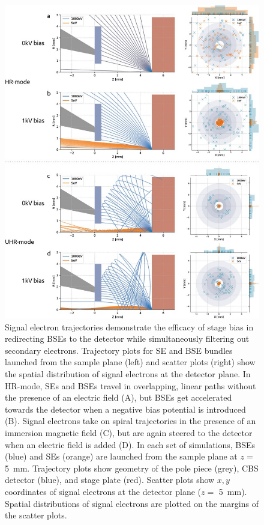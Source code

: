 \begin{figure}[!tbh]
    \centering
    \includegraphics[width=0.85\linewidth]{chapter-2/figures_JPEG_LQ/fig2-2_simulations.jpg}
    \caption{Signal electron trajectories demonstrate the efficacy of stage bias in redirecting BSEs to the detector while simultaneously filtering out secondary electrons. Trajectory plots for SE and BSE bundles launched from the sample plane (left) and scatter plots (right) show the spatial distribution of signal electrons at the detector plane. In HR-mode, SEs and BSEs travel in overlapping, linear paths without the presence of an electric field (A), but BSEs get accelerated towards the detector when a negative bias potential is introduced (B). Signal electrons take on spiral trajectories in the presence of an immersion magnetic field (C), but are again steered to the detector when an electric field is added (D). In each set of simulations, BSEs (blue) and SEs (orange) are launched from the sample plane at $z =$ \SI{5}{\milli\meter}. Trajectory plots show geometry of the pole piece (grey), CBS detector (blue), and stage plate (red). Scatter plots show $x, y$ coordinates of signal electrons at the detector plane ($z =$ \SI{5}{\milli\meter}). Spatial distributions of signal electrons are plotted on the margins of the scatter plots.}
    \label{fig:2.2_simulations}
\end{figure}

